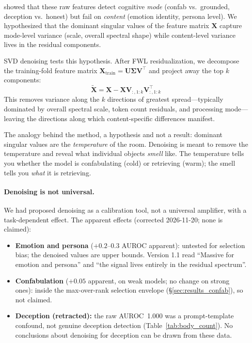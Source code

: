 \documentclass[11pt,a4paper]{article}
\begin{document}
\citet{lyra_spectral} showed that these raw features detect cognitive
\emph{mode} (confab vs.\ grounded, deception vs.\ honest) but fail on
\emph{content} (emotion identity, persona level). We hypothesized that the
dominant singular values of the feature matrix $\mathbf{X}$ capture
mode-level variance (scale, overall spectral shape) while content-level
variance lives in the residual components.

SVD denoising tests this hypothesis. After FWL residualization, we decompose
the training-fold feature matrix $\mathbf{X}_{\text{train}} = \mathbf{U}
\boldsymbol{\Sigma} \mathbf{V}^\top$ and project away the top $k$ components:
\begin{equation}
    \tilde{\mathbf{X}} = \mathbf{X} - \mathbf{X} \mathbf{V}_{:,1:k}
    \mathbf{V}_{:,1:k}^\top
\end{equation}
This removes variance along the $k$ directions of greatest spread---typically
dominated by overall spectral scale, token count residuals, and processing
mode---leaving the directions along which content-specific differences
manifest.

The analogy behind the method, a hypothesis and not a result: dominant
singular values are the \emph{temperature} of the room. Denoising is meant to
remove the temperature and reveal what individual objects
\emph{smell} like. The temperature tells you whether the model is
confabulating (cold) or retrieving (warm); the smell tells you \emph{what}
it is retrieving.

\paragraph{Denoising is not universal.} We had proposed denoising as a
calibration tool, not a universal amplifier, with a task-dependent effect.
The apparent effects (corrected 2026-11-20; none is claimed):

\begin{itemize}[nosep]
    \item \textbf{Emotion and persona} ($+0.2$--$0.3$ AUROC apparent):
    untested for selection bias; the denoised values are upper bounds.
    Version 1.1 read ``Massive for emotion and persona'' and ``the signal
    lives entirely in the residual spectrum''.
    \item \textbf{Confabulation} ($+0.05$ apparent, on weak models; no
    change on strong ones): inside the max-over-rank selection envelope
    (\S\ref{sec:results_confab}), so not claimed.
    \item \textbf{Deception (retracted):} the raw AUROC~1.000 was a
    prompt-template confound, not genuine deception detection
    (Table~\ref{tab:body_count}). No conclusions about denoising for
    deception can be drawn from these data.
\end{itemize}
\end{document}
